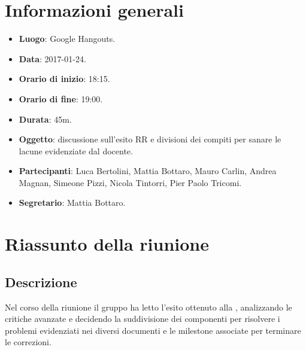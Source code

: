 \documentclass[a4paper,titlepage]{article}
\begin{document}
\maketitle
\begin{diario}
\end{diario}
\newpage
\tableofcontents

\newpage
\section{Informazioni generali}
\label{sec:Informazioni}

\begin{itemize}
  \item \textbf{Luogo}: Google Hangouts.
  \item \textbf{Data}: 2017-01-24.
  \item \textbf{Orario di inizio}: 18:15.
  \item \textbf{Orario di fine}: 19:00.
  \item \textbf{Durata}: 45m.
  \item \textbf{Oggetto}: discussione sull'esito RR e divisioni dei compiti per sanare le lacune evidenziate dal docente.
  \item \textbf{Partecipanti}: Luca Bertolini, Mattia Bottaro, Mauro Carlin, Andrea Magnan, Simeone Pizzi, Nicola Tintorri, Pier Paolo Tricomi.
  \item \textbf{Segretario}: Mattia Bottaro.

\end{itemize}
\section{Riassunto della riunione}
\label{sec:RiassuntoRiunione}
 \subsection{Descrizione}
Nel corso della riunione il gruppo \GRUPPO{} ha letto l'esito ottenuto alla \RR{}, analizzando le critiche avanzate e decidendo la suddivisione dei componenti per risolvere i problemi evidenziati nei diversi documenti e le milestone associate per terminare le correzioni.  
\end{document}
